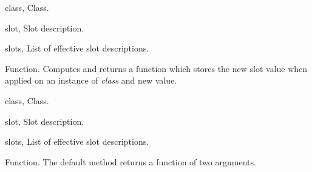 \begin{optDefinition}
%
\begin{genericargs}
    \item[class, \classref{class}] Class.
    \item[slot, \classref{slot}] Slot description.
    \item[slots, \classref{list}] List of effective slot
    descriptions.
\end{genericargs}
%
\result%
Function.
%
\remarks%
Computes and returns a function which stores the new slot value when
applied on an instance of {\em class} and new value.

%
\begin{specargs}
    \item[class, \classref{class}] Class.
    \item[slot, \classref{slot}] Slot description.
    \item[slots, \classref{list}] List of effective slot
    descriptions.
\end{specargs}
%
\result%
Function.
%
\remarks%
The default method returns a function of two arguments.
%
\end{optDefinition}

